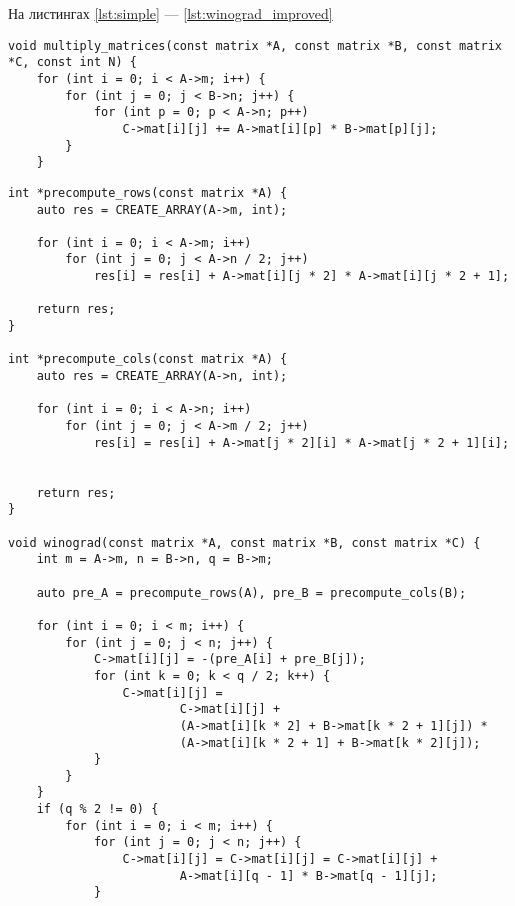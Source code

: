 На листингах \ref{lst:simple} --- \ref{lst:winograd_improved}
\begin{lstlisting}[caption=Реализация простого алгоритма умножения матриц, label=lst:simple]
void multiply_matrices(const matrix *A, const matrix *B, const matrix *C, const int N) {
    for (int i = 0; i < A->m; i++) {
        for (int j = 0; j < B->n; j++) {
            for (int p = 0; p < A->n; p++)
                C->mat[i][j] += A->mat[i][p] * B->mat[p][j];
        }
    }

\end{lstlisting}
\newpage
\begin{lstlisting}[caption=Реализация алгроитма умножения матриц Винограда, label=winograd]
int *precompute_rows(const matrix *A) {
    auto res = CREATE_ARRAY(A->m, int);

    for (int i = 0; i < A->m; i++)
        for (int j = 0; j < A->n / 2; j++)
            res[i] = res[i] + A->mat[i][j * 2] * A->mat[i][j * 2 + 1];

    return res;
}

int *precompute_cols(const matrix *A) {
    auto res = CREATE_ARRAY(A->n, int);

    for (int i = 0; i < A->n; i++)
        for (int j = 0; j < A->m / 2; j++)
            res[i] = res[i] + A->mat[j * 2][i] * A->mat[j * 2 + 1][i];


    return res;
}

void winograd(const matrix *A, const matrix *B, const matrix *C) {
    int m = A->m, n = B->n, q = B->m;

    auto pre_A = precompute_rows(A), pre_B = precompute_cols(B);

    for (int i = 0; i < m; i++) {
        for (int j = 0; j < n; j++) {
            C->mat[i][j] = -(pre_A[i] + pre_B[j]);
            for (int k = 0; k < q / 2; k++) {
                C->mat[i][j] =
                        C->mat[i][j] +
                        (A->mat[i][k * 2] + B->mat[k * 2 + 1][j]) *
                        (A->mat[i][k * 2 + 1] + B->mat[k * 2][j]);
            }
        }
    }
    if (q % 2 != 0) {
        for (int i = 0; i < m; i++) {
            for (int j = 0; j < n; j++) {
                C->mat[i][j] = C->mat[i][j] = C->mat[i][j] +
                        A->mat[i][q - 1] * B->mat[q - 1][j];
            }
\end{lstlisting}


